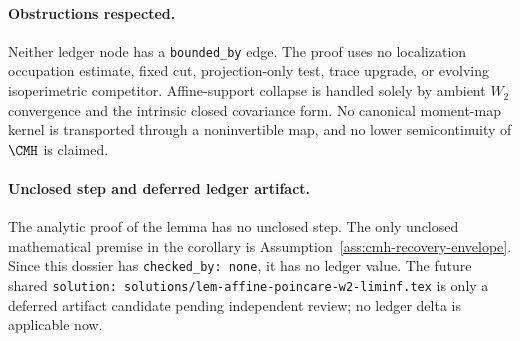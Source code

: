 \documentclass[../main.tex]{subfiles}
\begin{document}
\paragraph{Obstructions respected.}
Neither ledger node has a \texttt{bounded\_by} edge.  The proof uses no localization occupation
estimate, fixed cut, projection-only test, trace upgrade, or evolving isoperimetric competitor.
Affine-support collapse is handled solely by ambient $W_2$ convergence and the intrinsic closed
covariance form.  No canonical moment-map kernel is transported through a noninvertible map,
and no lower semicontinuity of $\CMH$ is claimed.

\paragraph{Unclosed step and deferred ledger artifact.}
The analytic proof of the lemma has no unclosed step.  The only unclosed mathematical premise in
the corollary is Assumption~\ref{ass:cmh-recovery-envelope}.  Since this dossier has
\texttt{checked\_by: none}, it has no ledger value.  The future shared
\texttt{solution: solutions/lem-affine-poincare-w2-liminf.tex} is only a deferred artifact
candidate pending independent review; no ledger delta is applicable now.
\end{document}
